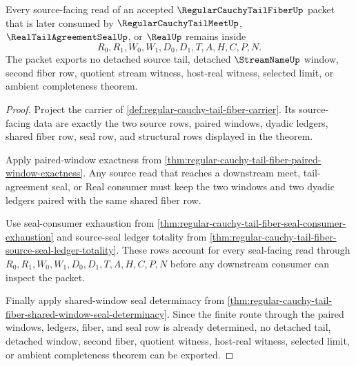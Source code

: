 \begin{theorem}
\label{thm:regular-cauchy-tail-fiber-source-nonescape}
Every source-facing read of an accepted $\RegularCauchyTailFiberUp$ packet that is later consumed by $\RegularCauchyTailMeetUp$, $\RealTailAgreementSealUp$, or $\RealUp$ remains inside
$$
R_0,R_1,W_0,W_1,D_0,D_1,T,A,H,C,P,N.
$$
The packet exports no detached source tail, detached $\StreamNameUp$ window, second fiber row, quotient stream witness, host-real witness, selected limit, or ambient completeness theorem.
\end{theorem}
\begin{proof}
Project the carrier of \autoref{def:regular-cauchy-tail-fiber-carrier}. Its source-facing data are exactly the two source rows, paired windows, dyadic ledgers, shared fiber row, seal row, and structural rows displayed in the theorem.

Apply paired-window exactness from \autoref{thm:regular-cauchy-tail-fiber-paired-window-exactness}. Any source read that reaches a downstream meet, tail-agreement seal, or Real consumer must keep the two windows and two dyadic ledgers paired with the same shared fiber row.

Use seal-consumer exhaustion from \autoref{thm:regular-cauchy-tail-fiber-seal-consumer-exhaustion} and source-seal ledger totality from \autoref{thm:regular-cauchy-tail-fiber-source-seal-ledger-totality}. These rows account for every seal-facing read through $R_0,R_1,W_0,W_1,D_0,D_1,T,A,H,C,P,N$ before any downstream consumer can inspect the packet.

Finally apply shared-window seal determinacy from \autoref{thm:regular-cauchy-tail-fiber-shared-window-seal-determinacy}. Since the finite route through the paired windows, ledgers, fiber, and seal row is already determined, no detached tail, detached window, second fiber, quotient witness, host-real witness, selected limit, or ambient completeness theorem can be exported.
\end{proof}

